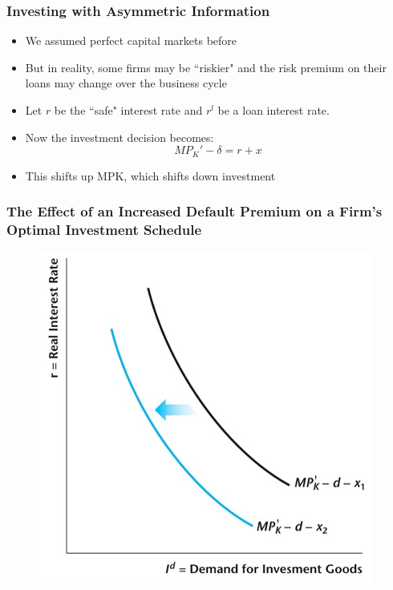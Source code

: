 \documentclass{beamer}
\begin{document}
\begin{frame}
\frametitle[alignment=center]{Investing with Asymmetric Information}
\begin{itemize}
\item We assumed perfect capital markets before
\bigskip
\item But in reality, some firms may be ``riskier" and the risk premium on their loans may change over the business cycle
\bigskip
\item Let $r$ be the ``safe" interest rate and $r^l$ be a loan interest rate.
\bigskip
\item Now the investment decision becomes:
$$MP_K'-\delta=r+x$$
\item This shifts up MPK, which shifts down investment
\end{itemize}
\end{frame}

\begin{frame}
\frametitle[alignment=center]{The Effect of an Increased Default Premium on a Firm's Optimal Investment Schedule}
\begin{figure}
\centering
\includegraphics[scale=0.6]{Figures/W_Fig_11pt11.png}
\end{figure}
\end{frame}
\end{document}
